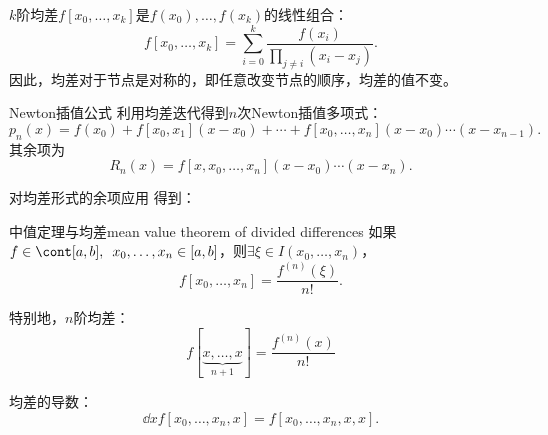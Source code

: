 \begin{corollary}
    $k$阶均差$f[x_0,\ldots,x_k]$是$f(x_0),\ldots,f(x_k)$的线性组合：
    \begin{equation}
        f[x_0,\ldots,x_k]=\sum_{i=0}^k\frac{f(x_i)}{\prod_{j\neq i}(x_i-x_j)}.
    \end{equation}
    因此，均差对于节点是对称的，即任意改变节点的顺序，均差的值不变。
\end{corollary}


\begin{theorem}
    {Newton插值公式}{}
    利用均差迭代得到$n$次Newton插值多项式：
    \begin{equation}
        p_n(x)=f(x_0)+f[x_0,x_1](x-x_0)+\cdots+f[x_0,\ldots,x_n](x-x_0)\cdots(x-x_{n-1}).
    \end{equation}
    其余项为
    \begin{equation}
        R_n(x)=f[x,x_0,\ldots,x_n](x-x_0)\cdots(x-x_n).
    \end{equation}
\end{theorem}

对均差形式的余项应用 得到：

\begin{theorem}
    {中值定理与均差}{mean value theorem of divided differences}
    如果$f\in\cont[a,b],\enspace x_0,\ldots,x_n\in[a,b]$，则$\exists\xi\in I(x_0,\ldots,x_n)$，
    \begin{equation}
        f[x_0,\ldots,x_n]=\frac{f^{(n)}(\xi)}{n!}.
    \end{equation}
\end{theorem}

\begin{corollary}
    特别地，$n$阶均差：
    \begin{equation}
        f[\underbrace{x,\ldots,x}_{n+1}]=\frac{f^{(n)}(x)}{n!}
    \end{equation}
\end{corollary}
\begin{corollary}
    均差的导数：
    \begin{equation}
        \dd xf[x_0,\ldots,x_n,x]=f[x_0,\ldots,x_n,x,x].
    \end{equation}
\end{corollary}

